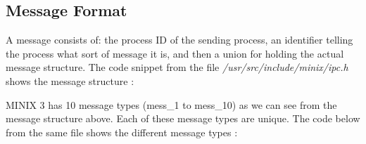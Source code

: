 \subsection{Message Format}

A message consists of: the process ID of the sending process, an identifier telling the process what sort of message it is, and then a union for holding the actual message structure. The code snippet from the file  \emph{/usr/src/include/minix/ipc.h} shows the message structure :
\begin{small}

\end{small}



MINIX 3 has 10 message types (mess\_1 to mess\_10) as we can see from the message structure above. Each of these message types are unique. The code below from the same file shows the different message types :
\begin{small}

\end{small}



